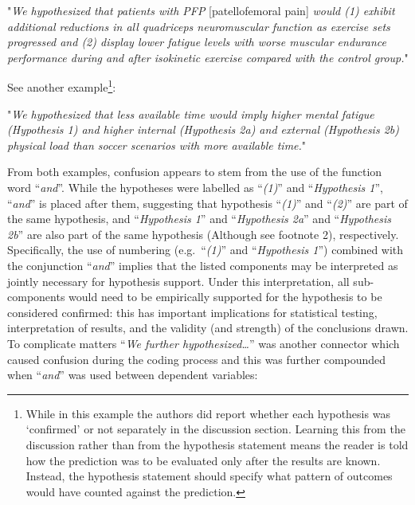 \documentclass[
]{article}
\begin{document}
\begin{center}

"\textit{We hypothesized that patients with PFP} [patellofemoral pain] \textit{would (1) exhibit additional reductions in all quadriceps neuromuscular function as exercise sets progressed and (2) display lower fatigue levels with worse muscular endurance performance during and after isokinetic exercise compared with the control group.}"

\end{center}

See another example\footnote{While in this example the authors did
  report whether each hypothesis was `confirmed' or not separately in
  the discussion section. Learning this from the discussion rather than
  from the hypothesis statement means the reader is told how the
  prediction was to be evaluated only after the results are known.
  Instead, the hypothesis statement should specify what pattern of
  outcomes would have counted against the prediction.}:

\begin{center}

"\textit{We hypothesized that less available time would imply higher mental fatigue (Hypothesis 1) and higher internal (Hypothesis 2a) and external (Hypothesis 2b) physical load than soccer scenarios with more available time.}"

\end{center}

From both examples, confusion appears to stem from the use of the
function word ``\emph{and}''. While the hypotheses were labelled as
``\emph{(1)}'' and ``\emph{Hypothesis 1}'', ``\emph{and}'' is placed
after them, suggesting that hypothesis ``\emph{(1)}'' and ``\emph{(2)}''
are part of the same hypothesis, and ``\emph{Hypothesis 1}'' and
``\emph{Hypothesis 2a}'' and ``\emph{Hypothesis 2b}'' are also part of
the same hypothesis (Although see footnote 2), respectively.
Specifically, the use of numbering (e.g.~``\emph{(1)}'' and
``\emph{Hypothesis 1}'') combined with the conjunction ``\emph{and}''
implies that the listed components may be interpreted as jointly
necessary for hypothesis support. Under this interpretation, all
sub-components would need to be empirically supported for the hypothesis
to be considered confirmed: this has important implications for
statistical testing, interpretation of results, and the validity (and
strength) of the conclusions drawn. To complicate matters ``\emph{We
further hypothesized\ldots{}}'' was another connector which caused
confusion during the coding process and this was further compounded when
``\emph{and}'' was used between dependent variables:
\end{document}
